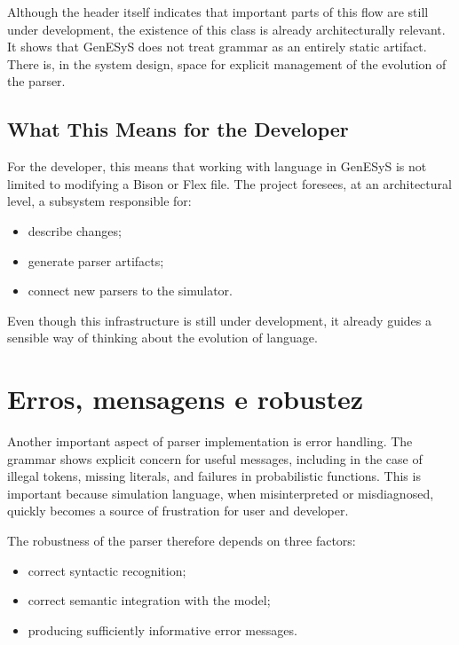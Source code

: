 Although the header itself indicates that important parts of this flow are still under development, the existence of this class is already architecturally relevant. It shows that GenESyS does not treat grammar as an entirely static artifact. There is, in the system design, space for explicit management of the evolution of the parser.

\subsection{What This Means for the Developer}
\label{subsec:cap9_o_que_significa_para_desenvolvedor}

For the developer, this means that working with language in GenESyS is not limited to modifying a Bison or Flex file. The project foresees, at an architectural level, a subsystem responsible for:
\begin{itemize}
 \item describe changes;
 \item generate parser artifacts;
 \item connect new parsers to the simulator.
\end{itemize}

Even though this infrastructure is still under development, it already guides a sensible way of thinking about the evolution of language.

\section{Erros, mensagens e robustez}
\label{sec:cap9_erros_mensagens_robustez}

Another important aspect of parser implementation is error handling. The grammar shows explicit concern for useful messages, including in the case of illegal tokens, missing literals, and failures in probabilistic functions. This is important because simulation language, when misinterpreted or misdiagnosed, quickly becomes a source of frustration for user and developer.

The robustness of the parser therefore depends on three factors:
\begin{itemize}
 \item correct syntactic recognition;
 \item correct semantic integration with the model;
 \item producing sufficiently informative error messages.
\end{itemize}

